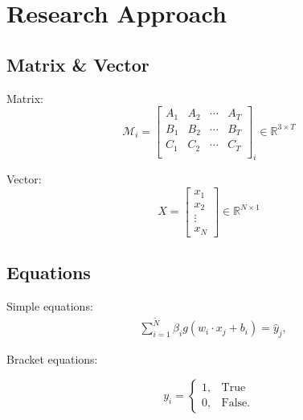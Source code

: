 \chapter{Research Approach}\label{Chap:ResearchApproach}

\lipsum[1-2]



\section{Matrix \& Vector}\label{sec:matrix}
Matrix:
\begin{equation*}
    \mathcal{M}_i 
=
\begin{bmatrix}
A_{1} & A_{2} & \cdots & A_{T}\\
B_{1} & B_{2} & \cdots & B_{T}\\
C_{1} & C_{2} & \cdots & C_{T}\\
\end{bmatrix}_i\in \mathbb{R}^{3\times T}
\end{equation*}

Vector:
\begin{equation*}
 X = 
\begin{bmatrix}
x_{1}\\
x_{2}\\
\vdots\\
x_N
\end{bmatrix} \in \mathbb{R}^{N\times 1}
\end{equation*}

\section{Equations}\label{sec:equation}
Simple equations:
\begin{align}
&\sum\limits_{i=1}^{\tilde{N}}\beta_ig(w_i\cdot x_j+b_i)=\hat y_j, 
\end{align}

Bracket equations: 

$$y_i = \begin{cases}
    1, & \text{True}\\
    0, & \text{False}.
\end{cases}$$



